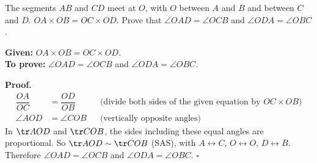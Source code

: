 \begin{example}
The segments $AB$ and $CD$ meet at $O$, with $O$ between $A$ and $B$ and between $C$ and $D$. $OA\times OB=OC\times OD$. Prove that $\angle OAD=\angle OCB$ and $\angle ODA=\angle OBC$.

\begin{center}\end{center}

\textbf{Given:} $OA\times OB=OC\times OD$.\\
\textbf{To prove:} $\angle OAD=\angle OCB$ and $\angle ODA=\angle OBC$.

\textbf{Proof.}
\[
\begin{aligned}
\dfrac{OA}{OC}&=\dfrac{OD}{OB} &&\text{(divide both sides of the given equation by $OC\times OB$)}\\
\angle AOD&=\angle COB &&\text{(vertically opposite angles)}
\end{aligned}
\]
In $\tr AOD$ and $\tr COB$, the sides including these equal angles are proportional. So $\tr AOD\sim\tr COB$ (SAS), with $A\leftrightarrow C$, $O\leftrightarrow O$, $D\leftrightarrow B$. Therefore $\angle OAD=\angle OCB$ and $\angle ODA=\angle OBC$. \hfill$\square$
\end{example}


